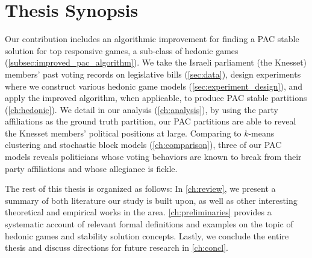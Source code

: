 \section{Thesis Synopsis}
Our contribution includes an algorithmic improvement for finding a PAC stable
solution for top responsive games, a sub-class of hedonic games
(\autoref{subsec:improved_pac_algorithm}).
We take the Israeli parliament (the Knesset) members' past voting records on
legislative bills (\autoref{sec:data}), design experiments where we construct
various hedonic game models (\autoref{sec:experiment_design}), and apply the
improved algorithm, when applicable, to produce PAC stable partitions
(\autoref{ch:hedonic}).
We detail in our analysis (\autoref{ch:analysis}), by using the party
affiliations as the ground truth partition, our PAC partitions are able to
reveal the Knesset members' political positions at large.
Comparing to $k$-means clustering and stochastic block models
(\autoref{ch:comparison}), three of our PAC models reveals politicians
whose voting behaviors are known to break from their party affiliations and
whose allegiance is fickle.

The rest of this thesis is organized as follows:
In \autoref{ch:review}, we present a summary of both literature our study is
built upon, as well as other interesting theoretical and empirical works in the area.
\autoref{ch:preliminaries} provides a systematic account of relevant formal
definitions and examples on the topic of hedonic games and stability solution
concepts.
Lastly, we conclude the entire thesis and discuss directions for future
research in \autoref{ch:concl}.
